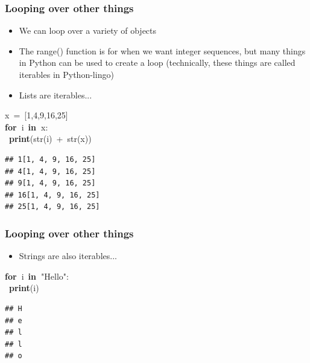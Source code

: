 \documentclass{beamer}\usepackage[]{graphicx}\usepackage[]{color}
\makeatletter
\newcommand{\hlnum}[1]{\textcolor[rgb]{0.686,0.059,0.569}{#1}}%
\newcommand{\hlstr}[1]{\textcolor[rgb]{0.192,0.494,0.8}{#1}}%
\newcommand{\hlopt}[1]{\textcolor[rgb]{0,0,0}{#1}}%
\newcommand{\hlstd}[1]{\textcolor[rgb]{0.345,0.345,0.345}{#1}}%
\newcommand{\hlkwa}[1]{\textcolor[rgb]{0.161,0.373,0.58}{\textbf{#1}}}%
\newcommand{\hlkwb}[1]{\textcolor[rgb]{0.69,0.353,0.396}{#1}}%
\newenvironment{kframe}{%
 \def\at@end@of@kframe{}%
 \ifinner\ifhmode%
  \def\at@end@of@kframe{\end{minipage}}%
  \begin{minipage}{\columnwidth}%
 \fi\fi%
 \def\FrameCommand##1{\hskip\@totalleftmargin \hskip-\fboxsep
 \colorbox{shadecolor}{##1}\hskip-\fboxsep
     \hskip-\linewidth \hskip-\@totalleftmargin \hskip\columnwidth}%
 \MakeFramed {\advance\hsize-\width
   \@totalleftmargin\z@ \linewidth\hsize
   \@setminipage}}%
 {\par\unskip\endMakeFramed%
 \at@end@of@kframe}
\newenvironment{knitrout}{}{} %
\makeatother
\begin{document}
\begin{frame}[fragile]
\frametitle{Looping over other things}
\begin{itemize}
	\item We can loop over a variety of objects

	\item The range() function is for when we want integer sequences, but many things in Python can be used to create a loop (technically, these things are called iterables in Python-lingo)

	\item Lists are iterables...

\end{itemize}
\begin{knitrout}
\color{fgcolor}\begin{kframe}
\noindent
\ttfamily
\hlstd{x\ }\hlopt{=\ {[}}\hlstd{}\hlnum{1}\hlstd{}\hlopt{,}\hlstd{}\hlnum{4}\hlstd{}\hlopt{,}\hlstd{}\hlnum{9}\hlstd{}\hlopt{,}\hlstd{}\hlnum{16}\hlstd{}\hlopt{,}\hlstd{}\hlnum{25}\hlstd{}\hlopt{{]}}\hspace*{\fill}\\
\hlstd{}\hlkwa{for\ }\hlstd{i\ }\hlkwa{in\ }\hlstd{x}\hlopt{:}\hspace*{\fill}\\
\hlstd{\ }\hlkwa{print}\hlstd{}\hlopt{(}\hlstd{}\hlkwb{str}\hlstd{}\hlopt{(}\hlstd{i}\hlopt{)\ +\ }\hlstd{}\hlkwb{str}\hlstd{}\hlopt{(}\hlstd{x}\hlopt{))}\hlstd{}\hspace*{\fill}
\mbox{}
\normalfont

\begin{verbatim}
## 1[1, 4, 9, 16, 25]
## 4[1, 4, 9, 16, 25]
## 9[1, 4, 9, 16, 25]
## 16[1, 4, 9, 16, 25]
## 25[1, 4, 9, 16, 25]
\end{verbatim}
\end{kframe}
\end{knitrout}

\end{frame}

\begin{frame}[fragile]
\frametitle{Looping over other things}
\begin{itemize}
	\item Strings are also iterables... 

\end{itemize}
\begin{knitrout}
\color{fgcolor}\begin{kframe}
\noindent
\ttfamily
\hlstd{}\hlkwa{for\ }\hlstd{i\ }\hlkwa{in\ }\hlstd{}\hlstr{"Hello"}\hlstd{}\hlopt{:}\hspace*{\fill}\\
\hlstd{\ }\hlkwa{print}\hlstd{}\hlopt{(}\hlstd{i}\hlopt{)}\hlstd{}\hspace*{\fill}
\mbox{}
\normalfont

\begin{verbatim}
## H
## e
## l
## l
## o
\end{verbatim}
\end{kframe}
\end{knitrout}
\end{frame}
\end{document}
